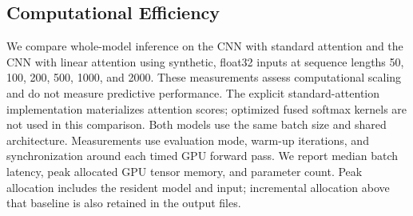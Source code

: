 \subsection{Computational Efficiency}
We compare whole-model inference on the CNN with standard attention and the CNN with linear attention using synthetic, float32 inputs at sequence lengths 50, 100, 200, 500, 1000, and 2000. These measurements assess computational scaling and do not measure predictive performance. The explicit standard-attention implementation materializes attention scores; optimized fused softmax kernels are not used in this comparison. Both models use the same batch size and shared architecture. Measurements use evaluation mode, warm-up iterations, and synchronization around each timed GPU forward pass. We report median batch latency, peak allocated GPU tensor memory, and parameter count. Peak allocation includes the resident model and input; incremental allocation above that baseline is also retained in the output files.

